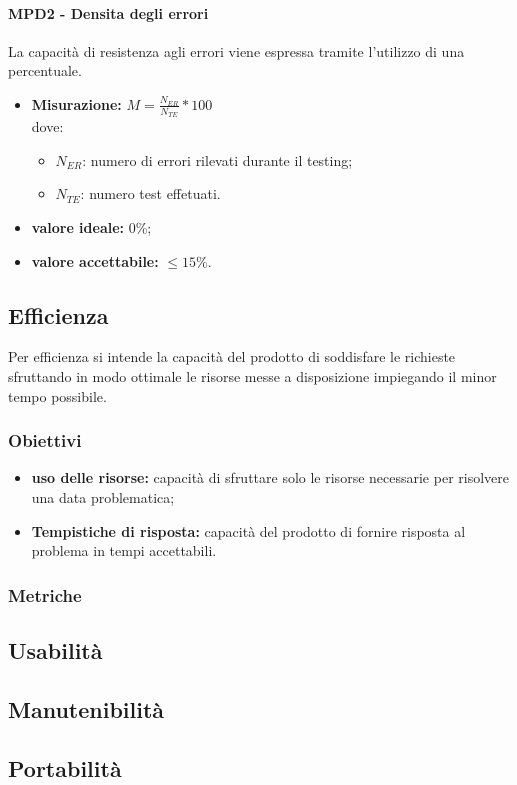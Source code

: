 \paragraph{MPD2 - Densita degli errori} La capacità di resistenza agli errori viene espressa tramite l'utilizzo di una percentuale.
\begin{itemize}
	\item \textbf{Misurazione:} \begin{math}M=\frac{N_{ER}}{N_{TE}}*100\end{math}\\
	dove:
	\begin {itemize}
		\item \begin{math}N_{ER}\end{math}: numero di errori rilevati durante il testing;
		\item \begin{math}N_{TE}\end{math}: numero test effetuati.
	\end{itemize}
	\item \textbf{valore ideale:} 0\%;
	\item \textbf{valore accettabile:}  \begin{math}\leq15\%\end{math}.
\end{itemize}

\subsection{Efficienza} Per efficienza si intende la capacità del prodotto di soddisfare le richieste sfruttando in modo ottimale le risorse messe a disposizione impiegando il minor tempo possibile.
\subsubsection{Obiettivi}
\begin{itemize}
	\item \textbf{uso delle risorse:} capacità di sfruttare solo le risorse necessarie per risolvere una data problematica;
	\item \textbf{Tempistiche di risposta:} capacità del prodotto di fornire risposta al problema in tempi accettabili.
\end{itemize}
\subsubsection{Metriche}


\subsection{Usabilità}
\subsection{Manutenibilità}
\subsection{Portabilità}